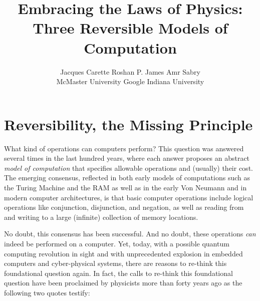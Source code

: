 \documentclass{article}
\title{Embracing the Laws of Physics: \\ Three Reversible Models of Computation}
\author{Jacques Carette \qquad\qquad Roshan P. James \qquad\qquad Amr Sabry \\
McMaster University \qquad\qquad Google \qquad\qquad Indiana University}
\begin{document}
\maketitle









\section{Reversibility, the Missing Principle}

What kind of operations can computers perform? This question was
answered several times in the last hundred years, where each answer
proposes an abstract \emph{model of computation} that specifies
allowable operations and (usually) their cost. The emerging consensus,
reflected in both early models of computations such as the Turing
Machine and the RAM as well as in the early Von Neumann and in modern
computer architectures, is that basic computer operations include
logical operations like conjunction, disjunction, and negation, as
well as reading from and writing to a large (infinite) collection of
memory locations.

No doubt, this consensus has been successful. And no doubt, these
operations \emph{can} indeed be performed on a computer. Yet, today,
with a possible quantum computing revolution in sight and with
unprecedented explosion in embedded computers and cyber-physical
systems, there are reasons to re-think this foundational question
again. In fact, the calls to re-think this foundational question have
been proclaimed by physicists more than forty years ago as the
following two quotes testify:
\end{document}
